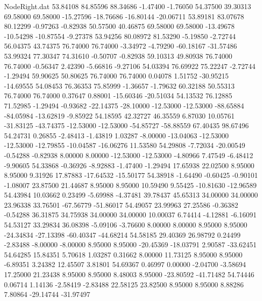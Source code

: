 \begin{filecontents}{NodeRight.dat}
  53.84108   84.85596   88.34686    -1.47400   -1.76050   54.37500   39.30313   69.58000   69.58000  -15.27596  -18.76686  -16.80144  -20.06711
  53.89181   83.07678   80.12299    -0.97263   -0.82938   50.57500   40.46875   69.58000   69.58000  -13.49678  -10.54298  -10.87554   -9.27378
  53.94256   80.08972   81.53290    -5.19850   -2.72744   56.04375   43.74375   76.74000   76.74000   -3.34972   -4.79290  -60.18167  -31.57486
  53.99324   77.30347   74.31610    -0.50707   -0.82938   59.10313   49.80938   76.74000   76.74000   -0.56347    2.42390   -5.66816   -9.27106
  54.03394   76.69922   75.22247    -2.72744   -1.29494   59.90625   50.80625   76.74000   76.74000    0.04078    1.51752  -30.95215  -14.69555
  54.08453   76.36353   75.85999    -1.36657   -1.79632   60.32188   50.55313   76.74000   76.74000    0.37647    0.88001  -15.60346  -20.51034
  54.13532   76.12885   71.52985    -1.29494   -0.93682  -22.14375  -28.10000  -12.53000  -12.53000  -88.65884  -84.05984  -13.62819   -9.85922
  54.18595   42.32727   46.35559     6.87030   10.05761  -31.83125  -43.74375  -12.53000  -12.53000  -54.85727  -58.88559   67.40435   98.67496
  54.24731    0.26855   -2.48413    -1.43819    1.03287   -8.00000  -13.04063  -12.53000  -12.53000  -12.79855  -10.04587  -16.06276   11.53580
  54.29808   -7.72034  -20.00549    -0.54288   -0.82938    8.00000    8.00000  -12.53000  -12.53000   -4.80966    7.47549   -6.48412   -9.90605
  54.33868   -0.36926   -8.92883    -1.47400   -1.29494   17.65938   22.02500    8.95000    8.95000    9.31926   17.87883  -17.64532  -15.50177
  54.38918   -1.64490   -0.60425    -0.90101   -1.08007   23.87500   21.44687    8.95000    8.95000   10.59490    9.55425  -10.81630  -12.96589
  54.43984   10.03662    0.23499    -5.69988   -4.37481   39.78437   45.65313   34.00000   34.00000   23.96338   33.76501  -67.56779  -51.86017
  54.49057   23.99963   27.25586    -0.36382   -0.54288   36.31875   34.75938   34.00000   34.00000   10.00037    6.74414   -4.12881   -6.16091
  54.53127   33.29834   36.08398    -5.09106   -3.76600    8.00000    8.00000    8.95000    8.95000  -24.34834  -27.13398  -60.40347  -44.68214
  54.58185   29.40369   26.98792     0.24499   -2.83488   -8.00000   -8.00000    8.95000    8.95000  -20.45369  -18.03791    2.90587  -33.62451
  54.64285   15.84351    5.70618     1.03287    0.31662    8.00000   11.73125    8.95000    8.95000   -6.89351    3.24382   12.45507    3.81801
  54.69367    0.46997    0.00000    -2.04700   -3.58694   17.25000   21.23438    8.95000    8.95000    8.48003    8.95000  -23.80592  -41.71482
  54.74446    0.06714    1.14136    -2.58419   -2.83488   22.58125   23.82500    8.95000    8.95000    8.88286    7.80864  -29.14744  -31.97497

\end{filecontents}

